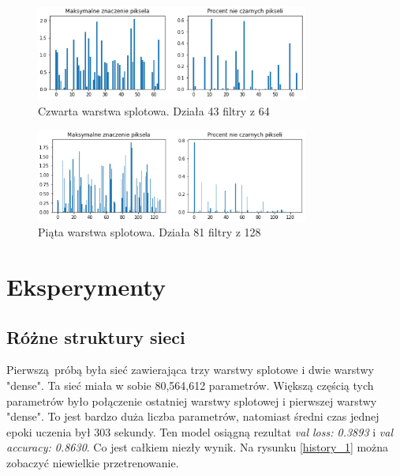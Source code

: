 \documentclass{article}
\begin{document}
\begin{figure}[H]
	\centering
	\includegraphics[width=0.8\textwidth,keepaspectratio=true]{statystyka_warstwy_4}
	\caption{Czwarta warstwa splotowa. Działa 43 filtry z 64}
	\label{statystyka_warstwy_4}
\end{figure}

\begin{figure}[H]
	\centering
	\includegraphics[width=0.8\textwidth,keepaspectratio=true]{statystyka_warstwy_5}
	\caption{Piąta warstwa splotowa. Działa 81 filtry z 128}
	\label{statystyka_warstwy_5}
\end{figure}

\section{Eksperymenty}

\subsection{Różne struktury sieci}
Pierwszą próbą była sieć zawierająca trzy warstwy splotowe i dwie warstwy "dense". Ta sieć miała w sobie 80,564,612 parametrów. Większą częścią tych parametrów było połączenie ostatniej warstwy splotowej i pierwszej warstwy "dense". To jest bardzo duża liczba parametrów, natomiast średni czas jednej epoki uczenia był 303 sekundy. Ten model osiągną rezultat \textit{val loss: 0.3893} i \textit{val accuracy: 0.8630}. Co jest całkiem niezły wynik. Na rysunku \ref{history_1} można zobaczyć niewielkie przetrenowanie. 
\end{document}
